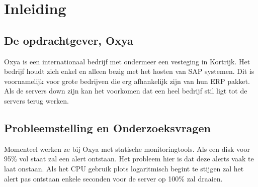 
\chapter{Inleiding}
\label{ch:inleiding}

\section{De opdrachtgever, Oxya}
\label{sec:de-opdrachtgever}

Oxya is een internationaal bedrijf met ondermeer een vesteging in Kortrijk. Het bedrijf houdt zich enkel en alleen bezig met het hosten van SAP systemen. Dit is voornamelijk voor grote bedrijven die erg afhankelijk zijn van hun ERP pakket. Als de servers down zijn kan het voorkomen dat een heel bedrijf stil ligt tot de servers terug werken.


\section{Probleemstelling en Onderzoeksvragen}
\label{sec:onderzoeksvragen}

Momenteel werken ze bij Oxya met statische monitoringtools. Als een disk voor 95\% vol staat zal een alert ontstaan. Het probleem hier is dat deze alerts vaak te laat onstaan. Als het CPU gebruik plots logaritmisch begint te stijgen zal het alert pas ontstaan enkele seconden voor de server op 100\% zal draaien. 



